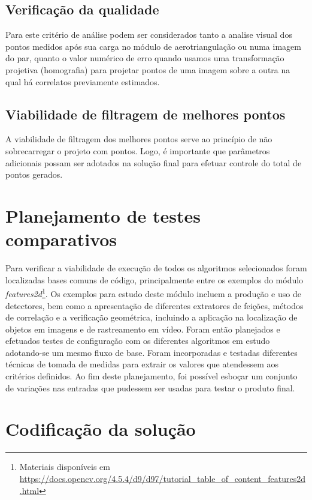 \subsection{Verificação da qualidade}

Para este critério de análise podem ser considerados tanto a analise visual dos pontos medidos após sua carga no módulo de aerotriangulação ou numa imagem do par, quanto o valor numérico de erro quando usamos uma transformação projetiva (homografia) para projetar pontos de uma imagem sobre a outra na qual há correlatos previamente estimados. 

\subsection{Viabilidade de filtragem de melhores pontos}

A viabilidade de filtragem dos melhores pontos serve ao princípio de não sobrecarregar o projeto com pontos. Logo, é importante que parâmetros adicionais possam ser adotados na solução final para efetuar controle do total de pontos gerados.



\section{Planejamento de testes comparativos}

Para verificar a viabilidade de execução de todos os algoritmos selecionados foram localizadas bases comuns de código, principalmente entre os exemplos do módulo \textit{features2d}\footnote{Materiais disponíveis em \url{https://docs.opencv.org/4.5.4/d9/d97/tutorial_table_of_content_features2d.html}}. 
Os exemplos para estudo deste módulo incluem a produção e uso de detectores, bem como a apresentação de diferentes extratores de feições, métodos de correlação e a verificação geométrica, incluindo a aplicação na localização de objetos em imagens e de rastreamento em vídeo.
Foram então planejados e efetuados testes de configuração com os diferentes algoritmos em estudo adotando-se um mesmo fluxo de base. Foram incorporadas e testadas diferentes técnicas de tomada de medidas para extrair os valores que atendessem aos critérios definidos. Ao fim deste planejamento, foi possível esboçar um conjunto de variações nas entradas que pudessem ser usadas para testar o produto final.



\section{Codificação da solução}

